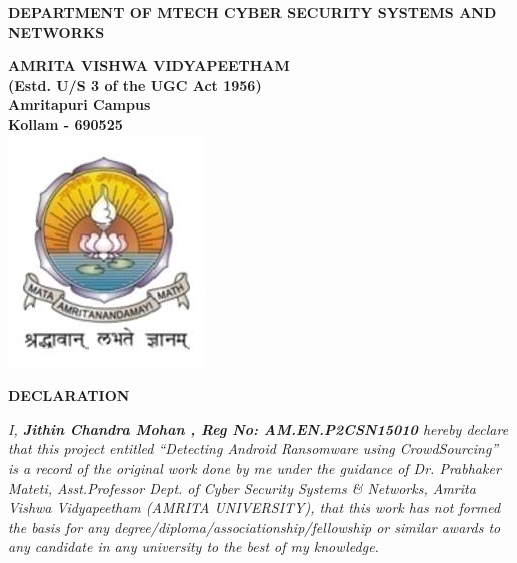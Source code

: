 \begin{center}


{\normalsize {\bfseries{DEPARTMENT OF MTECH CYBER SECURITY SYSTEMS AND NETWORKS\\[1ex]}}}


{\normalsize {\bfseries{AMRITA VISHWA VIDYAPEETHAM \\ (Estd. U/S 3 of the UGC Act 1956) \\[1ex]Amritapuri  Campus \\[1ex]
Kollam - 690525\\[1ex]}}}
\vspace{5mm}
    \includegraphics[scale=.3]{kkk.jpg}


                \rmfamily\bfseries\upshape\Large
\vspace{5mm}
                DECLARATION\\[1ex] %

\end{center}

        \vspace{1pt}    

\rmfamily\mdseries\upshape\normalsize                    

\justify
\textit{
I, \textbf{Jithin Chandra Mohan , Reg No: AM.EN.P2CSN15010 }hereby declare that
this project entitled “Detecting Android Ransomware using CrowdSourcing” 
is a record of the original work done by me under
the guidance of Dr. Prabhaker Mateti, Asst.Professor Dept. of Cyber Security Systems \& Networks, Amrita Vishwa Vidyapeetham (AMRITA UNIVERSITY), that
this work has not formed the basis for any degree/diploma/associationship/fellowship
or similar awards to any candidate in any university
to the best of my knowledge.}     

